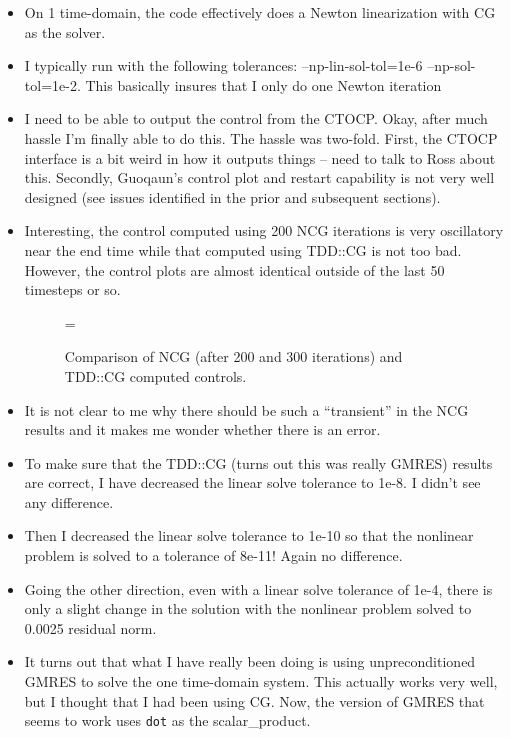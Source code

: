 \documentclass[12pt]{article}
\begin{document}
\begin{itemize}

\item On 1 time-domain, the code effectively does a Newton linearization with
CG as the solver.

\item I typically run with the following tolerances:  --np-lin-sol-tol=1e-6 
--np-sol-tol=1e-2.  This basically insures that I only do one Newton iteration

\item I need to be able to output the control from the CTOCP.  Okay, after
much hassle I'm finally able to do this.  The hassle was two-fold.  First, the
CTOCP interface is a bit weird in how it outputs things -- need to talk to
Ross about this.  Secondly, Guoqaun's control plot and restart capability is
not very well designed (see issues identified in the prior and subsequent
sections).

\item Interesting, the control computed using 200 NCG iterations is very
oscillatory near the end time while that computed using TDD::CG is not too
bad.  However, the control plots are almost identical outside of the last 50
timesteps or so.

\begin{figure}
\centering
\epsfxsize=\linewidth
{}
\caption{Comparison of NCG (after 200 and 300 iterations) and TDD::CG computed
controls.}
\label{f:phi_comp}
\end{figure}

\item It is not clear to me why there should be such a ``transient'' in the
NCG results and it makes me wonder whether there is an error.  

\item To make sure that the TDD::CG (turns out this was really GMRES) results
are correct, I have decreased the linear solve tolerance to 1e-8.  I didn't
see any difference.

\item Then I decreased the linear solve tolerance to 1e-10 so that the
nonlinear problem is solved to a tolerance of 8e-11!  Again no difference.

\item Going the other direction, even with a linear solve tolerance of 1e-4,
there is only a slight change in the solution with the nonlinear problem
solved to 0.0025 residual norm.

\item It turns out that what I have really been doing is using
unpreconditioned GMRES to solve the one time-domain system.  This actually
works very well, but I thought that I had been using CG.  Now, the version of
GMRES that seems to work uses {\tt dot} as the scalar\_product.


\end{itemize}
\end{document}

